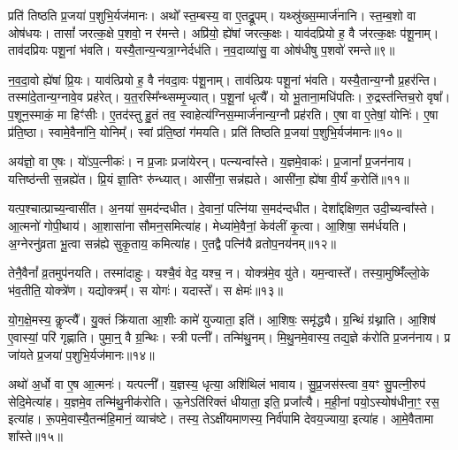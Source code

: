 प्रति॑ तिष्ठति प्र॒जया॑ प॒शुभि॒र्यज॑मानः।
अथो᳚ स्त॒म्बस्य॒ वा ए॒तद्रू॒पम्।
यथ्स्रु॑ख्स॒म्मार्ज॑नानि।
स्त॒म्ब॒शो वा ओष॑धयः।
तासां᳚ जरत्क॒क्षे प॒शवो॒ न र॑मन्ते।
अप्रि॑यो॒ ह्ये॑षां जरत्क॒क्षः।
याव॑दप्रियो ह॒ वै ज॑रत्क॒क्षः प॑शू॒नाम्।
ताव॑दप्रियः पशू॒नां भ॑वति।
यस्यै॒तान्य॒न्यत्रा॒ग्नेर्दध॑ति।
न॒व॒दाव्या॑सु॒ वा ओष॑धीषु प॒शवो॑ रमन्ते॥९॥\ip

न॒व॒दा॒वो ह्ये॑षां प्रि॒यः।
याव॑त्प्रियो ह॒ वै न॑वदा॒वः प॑शू॒नाम्।
ताव॑त्प्रियः पशू॒नां भ॑वति।
यस्यै॒तान्य॒ग्नौ प्र॒हर॑न्ति।
तस्मा॑दे॒तान्य॒ग्नावे॒व प्रह॑रेत्।
य॒त॒रस्मि᳚न्थ्सम्मृ॒ज्यात्।
प॒शू॒नां धृत्यै᳚।
यो भू॒ताना॒मधि॑पतिः।
रु॒द्रस्त॑न्तिच॒रो वृषा᳚।
प॒शून॒स्माकं॒ मा हिꣳ॑सीः।
ए॒तद॑स्तु हु॒तं तव॒ स्वाहेत्य॑ग्निस॒म्मार्ज॑नान्य॒ग्नौ प्रह॑रति।
ए॒षा वा ए॒तेषां॒ योनिः॑।
ए॒षा प्र॑ति॒ष्ठा।
स्वामे॒वैना॑नि॒ योनिम्᳚।
स्वां प्र॑ति॒ष्ठां ग॑मयति।
प्रति॑ तिष्ठति प्र॒जया॑ प॒शुभि॒र्यज॑मानः॥१०॥\ip{}

अय॑ज्ञो॒ वा ए॒षः।
यो॑ऽप॒त्नीकः॑।
न प्र॒जाः प्रजा॑येरन्।
पत्न्यन्वा᳚स्ते।
य॒ज्ञमे॒वाकः॑।
प्र॒जानां᳚ प्र॒जन॑नाय।
यत्तिष्ठ॑न्ती स॒न्नह्ये॑त।
प्रि॒यं ज्ञा॒तिꣳ रु॑न्ध्यात्।
आसी॑ना॒ सन्न॑ह्यते।
आसी॑ना॒ ह्ये॑षा वी॒र्यं॑ क॒रोति॑॥११॥\ip

यत्प॒श्चात्प्राच्य॒न्वासी॑त।
अ॒नया॑ स॒मद॑न्दधीत।
दे॒वानां॒ पत्नि॑या स॒मद॑न्दधीत।
देशा᳚द्दक्षिण॒त उदी॒च्यन्वा᳚स्ते।
आ॒त्मनो॑ गोपी॒थाय॑।
आ॒शासा॑ना सौमन॒समित्या॑ह।
मेध्या॑मे॒वैनां॒ केव॑लीं कृ॒त्वा।
आ॒शिषा॒ सम॑र्धयति।
अ॒ग्नेरनु॑\-व्रता भू॒त्वा सन्न॑ह्ये सुकृ॒ताय॒ कमित्या॑ह।
ए॒तद्वै पत्नि॑यै व्रतोप॒नय॑नम्॥१२॥\ip

तेनै॒वैनां᳚ व्र॒तमुप॑नयति।
तस्मा॑दाहुः।
यश्चै॒वं वेद॒ यश्च॒ न।
योक्त्र॑मे॒व यु॑ते।
यम॒न्वास्ते᳚।
तस्या॒मुष्मिँ॑ल्लो॒के भ॑व॒तीति॒ योक्त्रे॑ण।
यद्योक्त्रम्᳚।
स योगः॑।
यदास्ते᳚।
स क्षेमः॑॥१३॥\ip

यो॒ग॒क्षे॒मस्य॒ कॢप्त्यै᳚।
यु॒क्तं क्रि॑याता आ॒शीः कामे॑ युज्याता॒ इति॑।
आ॒शिषः॒ समृ॑द्ध्यै।
ग्र॒न्थिं ग्र॑थ्नाति।
आ॒शिष॑ ए॒वास्यां॒ परि॑ गृह्णाति।
पुमा॒न्॒ वै ग्र॒न्थिः।
स्त्री पत्नी᳚।
तन्मि॑थु॒नम्।
मि॒थु॒नमे॒वास्य॒ तद्य॒ज्ञे क॑रोति प्र॒जन॑नाय।
प्र जा॑यते प्र॒जया॑ प॒शुभि॒र्यज॑मानः॥१४॥\ip

अथो॑ अ॒र्धो वा ए॒ष आ॒त्मनः॑।
यत्पत्नी᳚।
य॒ज्ञस्य॒ धृत्या॒ अशि॑थिलं भावाय।
सु॒प्र॒जस॑स्त्वा व॒यꣳ सु॒पत्नी॒रुप॑ सेदि॒मेत्या॑ह।
य॒ज्ञमे॒व तन्मि॑थु॒नीक॑रोति।
ऊ॒नेऽति॑रिक्तं धीयाता॒ इति॒ प्रजा᳚त्यै।
म॒ही॒नां पयो॒\-ऽस्योष॑धीना॒ꣳ॒ रस॒ इत्या॑ह।
रू॒पमे॒वास्यै॒तन्म॑हि॒मानं॒ व्याच॑ष्टे।
तस्य॒ तेऽक्षी॑यमाणस्य॒ निर्व॑पामि देवय॒ज्याया॒ इत्या॑ह।
आ॒\-मे॒वैतामा शा᳚स्ते॥१५॥\ip\anuvakamend[क॒रोति॑ व्रतोप॒नय॑नं॒ क्षेमो॒ यज॑मानः शास्ते]

